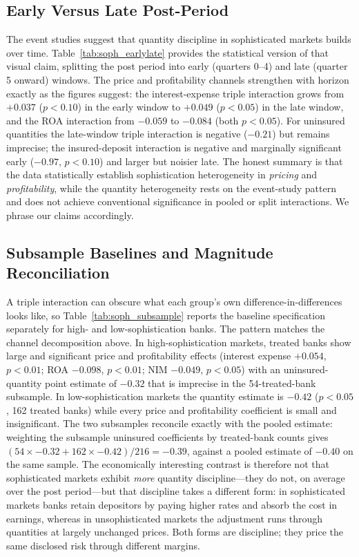 \subsection{Early Versus Late Post-Period}
\label{sec:heterogeneity:earlylate}

The event studies suggest that quantity discipline in sophisticated markets
builds over time.  Table~\ref{tab:soph_earlylate} provides the statistical
version of that visual claim, splitting the post period into early
(quarters 0--4) and late (quarter 5 onward) windows.  The price and
profitability channels strengthen with horizon exactly as the figures
suggest: the interest-expense triple interaction grows from $+0.037$
($p < 0.10$) in the early window to $+0.049$ ($p < 0.05$) in the late window,
and the ROA interaction from $-0.059$ to $-0.084$ (both $p < 0.05$).  For
uninsured quantities the late-window triple interaction is negative
($-0.21$) but remains imprecise; the insured-deposit interaction is negative
and marginally significant early ($-0.97$, $p < 0.10$) and larger but noisier
late.  The honest summary is that the data statistically establish
sophistication heterogeneity in \emph{pricing} and \emph{profitability},
while the quantity heterogeneity rests on the event-study pattern and does
not achieve conventional significance in pooled or split interactions.  We
phrase our claims accordingly.

\subsection{Subsample Baselines and Magnitude Reconciliation}
\label{sec:heterogeneity:subsample}

A triple interaction can obscure what each group's own
difference-in-differences looks like, so Table~\ref{tab:soph_subsample}
reports the baseline specification separately for high- and
low-sophistication banks.  The pattern matches the channel decomposition
above.  In high-sophistication markets, treated banks show large and
significant price and profitability effects (interest expense $+0.054$,
$p < 0.01$; ROA $-0.098$, $p < 0.01$; NIM $-0.049$, $p < 0.05$) with an
uninsured-quantity point estimate of $-0.32$ that is imprecise in the
54-treated-bank subsample.  In low-sophistication markets the quantity
estimate is $-0.42$ ($p < 0.05$, 162 treated banks) while every price and
profitability coefficient is small and insignificant.  The two subsamples
reconcile exactly with the pooled estimate: weighting the subsample
uninsured coefficients by treated-bank counts gives
$(54 \times -0.32 + 162 \times -0.42)/216 = -0.39$, against a pooled
estimate of $-0.40$ on the same sample.  The economically interesting
contrast is therefore not that sophisticated markets exhibit \emph{more}
quantity discipline---they do not, on average over the post period---but
that discipline takes a different form: in sophisticated markets banks retain
depositors by paying higher rates and absorb the cost in earnings, whereas in
unsophisticated markets the adjustment runs through quantities at largely
unchanged prices.  Both forms are discipline; they price the same disclosed
risk through different margins.
